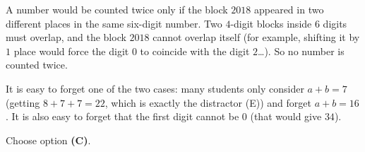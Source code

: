 {
A number would be counted twice only if the block $2018$ appeared in two different places in the same six-digit number. Two $4$-digit blocks inside $6$ digits must overlap, and the block $2018$ cannot overlap itself (for example, shifting it by $1$ place would force the digit $0$ to coincide with the digit $2$\dots). So no number is counted twice.

\begin{warnbox}It is easy to forget one of the two cases: many students only consider $a+b=7$ (getting $8+7+7=22$, which is exactly the distractor (E)) and forget $a+b=16$. It is also easy to forget that the first digit cannot be $0$ (that would give $34$).\end{warnbox}

Choose option \textbf{(C)}.
}

